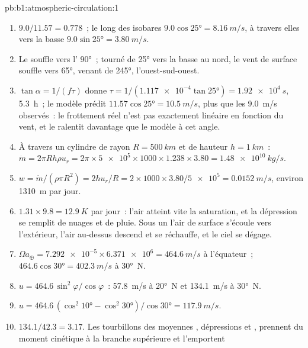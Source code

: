 \begin{solution}{pb:b1:atmospheric-circulation:1}
\begin{enumerate}
        l'équilibre n'a pas le temps de s'installer, et la formule ne s'applique pas.
  \item $9.0/11.57 = 0.778$~; le long des isobares $9.0\cos\ang{25} = \qty{8.16}{m/s}$,
        à travers elles vers la basse $9.0\sin\ang{25} = \qty{3.80}{m/s}$.
  \item Le  souffle vers l' \ang{90}~; tourné de \ang{25} vers
        la basse au nord, le vent de surface souffle vers \ang{65}, venant de
        \ang{245}, l'ouest-sud-ouest.
  \item $\tan\alpha = 1/(f\tau)$ donne $\tau = 1/(\num{1.117e-4}\tan\ang{25}) =
        \qty{1.92e4}{s}$, \qty{5.3}{h}~; le modèle prédit $11.57\cos\ang{25} =
        \qty{10.5}{m/s}$, plus que les \qty{9.0}{m/s} observés~: le frottement réel
        n'est pas exactement linéaire en fonction du vent, et le ralentit davantage que le modèle à cet
        angle.
  \item À travers un cylindre de rayon $R = \qty{500}{km}$ et de hauteur $h =
        \qty{1}{km}$~: $\dot m = 2\pi R h\rho u_r = 2\pi \times \num{5e5} \times 1000
        \times 1.238 \times 3.80 = \qty{1.48e10}{kg/s}$.
  \item $w = \dot m/(\rho\pi R^2) = 2hu_r/R = 2 \times 1000 \times 3.80/\num{5e5} =
        \qty{0.0152}{m/s}$, environ \qty{1310}{m} par jour.
  \item $1.31 \times 9.8 = \qty{12.9}{K}$ par jour~: l'air atteint vite la saturation,
        et la dépression se remplit de nuages et de pluie. Sous un  l'air de
        surface s'écoule vers l'extérieur, l'air au-dessus descend et se réchauffe, et le ciel
        se dégage.
  \item $\Omega a_\oplus = \num{7.292e-5} \times \num{6.371e6} = \qty{464.6}{m/s}$
        à l'équateur~; $464.6\cos\ang{30} = \qty{402.3}{m/s}$ à \ang{30}~N.
  \item $u = 464.6\,\sin^2\varphi/\cos\varphi$~: \qty{57.8}{m/s} à \ang{20}~N et
        \qty{134.1}{m/s} à \ang{30}~N.
  \item $u = 464.6\,(\cos^2\ang{10} - \cos^2\ang{30})/\cos\ang{30} =
        \qty{117.9}{m/s}$.
  \item $134.1/42.3 = 3.17$. Les tourbillons des moyennes , dépressions et
        , prennent du moment cinétique à la branche supérieure et l'emportent

\end{enumerate}
\end{solution}
